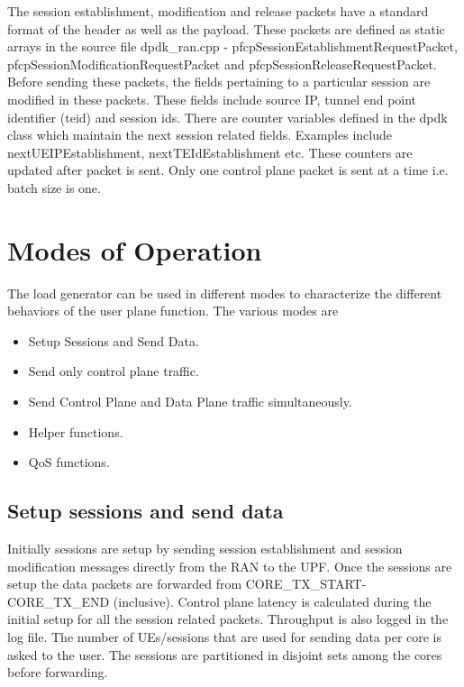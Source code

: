 The session establishment, modification and release packets have a standard format of the header as well as the
payload. These packets are defined as static arrays in the source file dpdk\_ran.cpp - pfcpSessionEstablishmentRequestPacket, pfcpSessionModificationRequestPacket and pfcpSessionReleaseRequestPacket.
Before sending these packets, the fields pertaining to a particular session are modified in these packets.
These fields include source IP, tunnel end point identifier (teid) and session ids.
There are counter variables defined in the dpdk class which maintain the next session related fields.
Examples include nextUEIPEstablishment, nextTEIdEstablishment etc. These counters are updated after packet is sent.
Only one control plane packet is sent at a time i.e. batch size is one.




\section{Modes of Operation}
The load generator can be used in different modes to characterize the different behaviors of the user plane function. The various modes are
\begin{itemize}
	\item Setup Sessions and Send Data.
	\item Send only control plane traffic.
	\item Send Control Plane and Data Plane traffic simultaneously.
	\item Helper functions.
	\item QoS functions.
\end{itemize}
\subsection{Setup sessions and send data}
Initially sessions are setup by sending session establishment and session modification messages directly from the RAN to the UPF.
Once the sessions are setup the data packets are forwarded from CORE\_TX\_START- CORE\_TX\_END (inclusive).
Control plane latency is calculated during the initial setup for all the session related packets. Throughput is also logged in the log file.
The number of UEs/sessions that are used for sending data per core is asked to the user. The sessions are partitioned in disjoint sets among the cores before forwarding.

